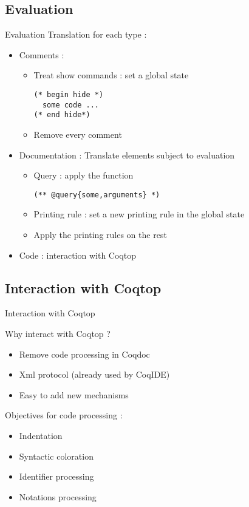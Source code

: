 \documentclass[compress]{beamer}
\newenvironment{tframe}[1]{
  \subsection{#1}
  \begin{frame}{#1}
  }{
  \end{frame}
  }
\begin{document}
    \subsection{Evaluation}
    \begin{frame}[containsverbatim]{Evaluation}
    Translation for each type :
    \begin{itemize}
      \item Comments : \\
         \begin{itemize}
           \item Treat show commands : set a global state
             \begin{lstlisting}
(* begin hide *)
  some code ...
(* end hide*)
\end{lstlisting}
           \item Remove every comment
        \end{itemize}
      \item Documentation : Translate elements subject to evaluation \\
        \begin{itemize}
          \item Query : apply the function
\begin{lstlisting}
(** @query{some,arguments} *)
\end{lstlisting}

          \item Printing rule : set a new printing rule in the global state
          \item Apply the printing rules on the rest
        \end{itemize}
      \item Code : interaction with Coqtop
    \end{itemize}
  \end{frame}


  \begin{tframe}{Interaction with Coqtop}
    Why interact with Coqtop ?
    \begin{itemize}[<+->]
      \item Remove code processing in Coqdoc
      \item Xml protocol (already used by CoqIDE)
      \item Easy to add new mechanisms
    \end{itemize}
    \vfill
    Objectives for code processing :
    \begin{itemize}
      \item Indentation
      \item Syntactic coloration
      \item Identifier processing
      \item Notations processing %
    \end{itemize}
  \end{tframe}
\end{document}

